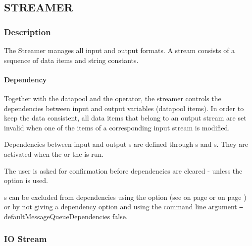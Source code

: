 \newpage
\subsection{STREAMER}
\label{sec:streamer}
\subsubsection{Description}
\label{sec:stdescription}
The Streamer manages all input and output formats. A stream consists
of a sequence of data items and string constants.

\paragraph{Dependency}
\label{par:stdependency}
Together with the
datapool and the operator, the streamer controls the dependencies
between input and output variables (datapool items).
In order to keep the data consistent,
all data items that belong to an output stream are set invalid
when one of the items of a corresponding input stream is modified.

Dependencies between input and output \STREAM{}s are defined through
\PROCESSGROUP{}s and \MESSAGEQUEUE{} \REQUEST{}s. They are activated
when the \PROCESSGROUP{} or the \MESSAGEQUEUE{} \REQUEST{} is run.

The user is asked for confirmation before dependencies are cleared
- unless the option \AUTOCLEARDEPENDENCIES{} is used.

\STREAM{}s can be excluded from dependencies using the option \NODEPENDENCIES{}
(see  on page \pageref{dia:jobmessagequeueoption} or
 on page \pageref{dia:jobpluginoption}) or by not giving
a dependency option and using the \INTENS command line argument
\texttt{--}defaultMessageQueueDependencies false.



\subsubsection{IO Stream}
\label{sec:ststream}

\vspace{1cm}

